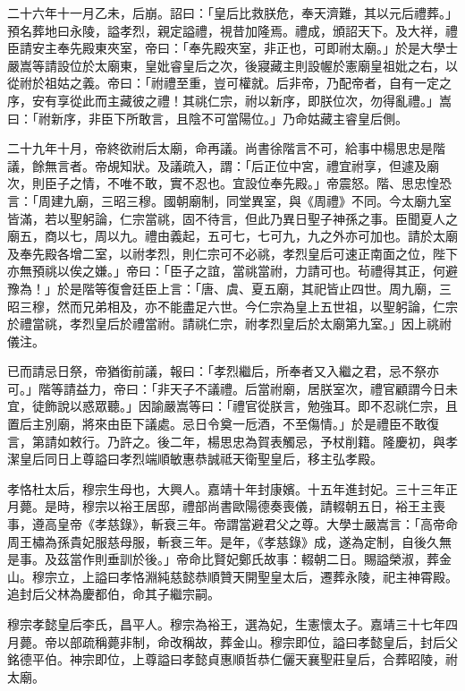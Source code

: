 二十六年十一月乙未，后崩。詔曰：「皇后比救朕危，奉天濟難，其以元后禮葬。」預名葬地曰永陵，謚孝烈，親定謚禮，視昔加隆焉。禮成，頒詔天下。及大祥，禮臣請安主奉先殿東夾室，帝曰：「奉先殿夾室，非正也，可即祔太廟。」於是大學士嚴嵩等請設位於太廟東，皇妣睿皇后之次，後寢藏主則設幄於憲廟皇祖妣之右，以從祔於祖姑之義。帝曰：「祔禮至重，豈可權就。后非帝，乃配帝者，自有一定之序，安有享從此而主藏彼之禮！其祧仁宗，祔以新序，即朕位次，勿得亂禮。」嵩曰：「祔新序，非臣下所敢言，且陰不可當陽位。」乃命姑藏主睿皇后側。

二十九年十月，帝終欲祔后太廟，命再議。尚書徐階言不可，給事中楊思忠是階議，餘無言者。帝覘知狀。及議疏入，謂：「后正位中宮，禮宜祔享，但遽及廟次，則臣子之情，不唯不敢，實不忍也。宜設位奉先殿。」帝震怒。階、思忠惶恐言：「周建九廟，三昭三穆。國朝廟制，同堂異室，與《周禮》不同。今太廟九室皆滿，若以聖躬論，仁宗當祧，固不待言，但此乃異日聖子神孫之事。臣聞夏人之廟五，商以七，周以九。禮由義起，五可七，七可九，九之外亦可加也。請於太廟及奉先殿各增二室，以祔孝烈，則仁宗可不必祧，孝烈皇后可速正南面之位，陛下亦無預祧以俟之嫌。」帝曰：「臣子之誼，當祧當祔，力請可也。茍禮得其正，何避豫為！」於是階等復會廷臣上言：「唐、虞、夏五廟，其祀皆止四世。周九廟，三昭三穆，然而兄弟相及，亦不能盡足六世。今仁宗為皇上五世祖，以聖躬論，仁宗於禮當祧，孝烈皇后於禮當祔。請祧仁宗，祔孝烈皇后於太廟第九室。」因上祧祔儀注。

已而請忌日祭，帝猶銜前議，報曰：「孝烈繼后，所奉者又入繼之君，忌不祭亦可。」階等請益力，帝曰：「非天子不議禮。后當祔廟，居朕室次，禮官顧謂今日未宜，徒飾說以惑眾聽。」因諭嚴嵩等曰：「禮官從朕言，勉強耳。即不忍祧仁宗，且置后主別廟，將來由臣下議處。忌日令奠一卮酒，不至傷情。」於是禮臣不敢復言，第請如敕行。乃許之。後二年，楊思忠為賀表觸忌，予杖削籍。隆慶初，與孝潔皇后同日上尊謚曰孝烈端順敏惠恭誠祗天衛聖皇后，移主弘孝殿。

孝恪杜太后，穆宗生母也，大興人。嘉靖十年封康嬪。十五年進封妃。三十三年正月薨。是時，穆宗以裕王居邸，禮部尚書歐陽德奏喪儀，請輟朝五日，裕王主喪事，遵高皇帝《孝慈錄》，斬衰三年。帝謂當避君父之尊。大學士嚴嵩言：「高帝命周王橚為孫貴妃服慈母服，斬衰三年。是年，《孝慈錄》成，遂為定制，自後久無是事。及茲當作則垂訓於後。」帝命比賢妃鄭氏故事：輟朝二日。賜謚榮淑，葬金山。穆宗立，上謚曰孝恪淵純慈懿恭順贊天開聖皇太后，遷葬永陵，祀主神霄殿。追封后父林為慶都伯，命其子繼宗嗣。

穆宗孝懿皇后李氏，昌平人。穆宗為裕王，選為妃，生憲懷太子。嘉靖三十七年四月薨。帝以部疏稱薨非制，命改稱故，葬金山。穆宗即位，謚曰孝懿皇后，封后父銘德平伯。神宗即位，上尊謚曰孝懿貞惠順哲恭仁儷天襄聖莊皇后，合葬昭陵，祔太廟。

